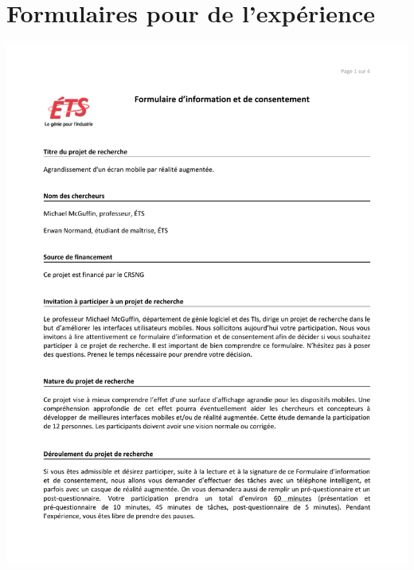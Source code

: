 \chapter{Formulaires pour de l'expérience}
\label{appendix:experiment_forms}

\includegraphics[page=1, scale=0.75, trim={0 0.5cm 0 2.5cm}, clip]{content/9_experiment_forms_1.pdf}


